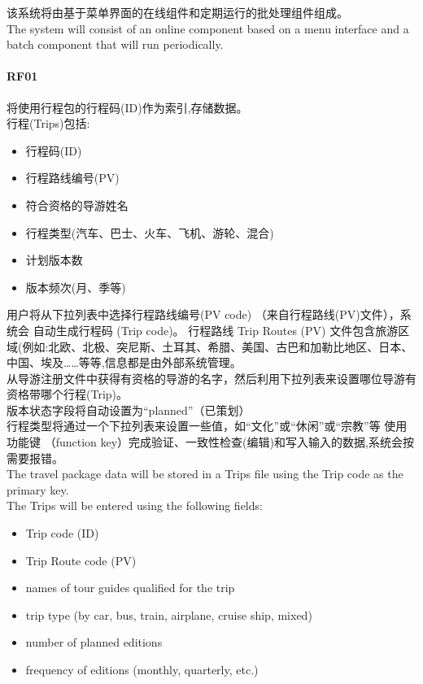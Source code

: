 该系统将由基于菜单界面的在线组件和定期运行的批处理组件组成。\\
The system will consist of an online component based on a menu interface
and a batch component that will run periodically.

\hypertarget{rf01-2}{%
\paragraph{RF01}\label{rf01-2}}

将使用行程包的行程码(ID)作为索引,存储数据。\\
行程(Trips)包括:

\begin{itemize}
\tightlist
\item
  行程码(ID)
\item
  行程路线编号(PV)
\item
  符合资格的导游姓名
\item
  行程类型(汽车、巴士、火车、飞机、游轮、混合)
\item
  计划版本数
\item
  版本频次(月、季等)\\
\end{itemize}

用户将从下拉列表中选择行程路线编号(PV code)
（来自行程路线(PV)文件），系统会 自动生成行程码 (Trip code)。 行程路线
Trip Routes (PV)
文件包含旅游区域(例如:北欧、北极、突尼斯、土耳其、希腊、美国、古巴和加勒比地区、日本、中国、埃及\ldots{}\ldots{}等等,信息都是由外部系统管理。\\
从导游注册文件中获得有资格的导游的名字，然后利用下拉列表来设置哪位导游有资格带哪个行程(Trip)。\\
版本状态字段将自动设置为``planned''（已策划）\\
行程类型将通过一个下拉列表来设置一些值，如``文化''或``休闲''或``宗教''等
使用功能键 （function
key）完成验证、一致性检查(编辑)和写入输入的数据,系统会按需要报错。\\
The travel package data will be stored in a Trips file using the Trip
code as the primary key.\\
The Trips will be entered using the following fields:

\begin{itemize}
\tightlist
\item
  Trip code (ID)
\item
  Trip Route code (PV)
\item
  names of tour guides qualified for the trip
\item
  trip type (by car, bus, train, airplane, cruise ship, mixed)
\item
  number of planned editions
\item
  frequency of editions (monthly, quarterly, etc.)\\
\end{itemize}

